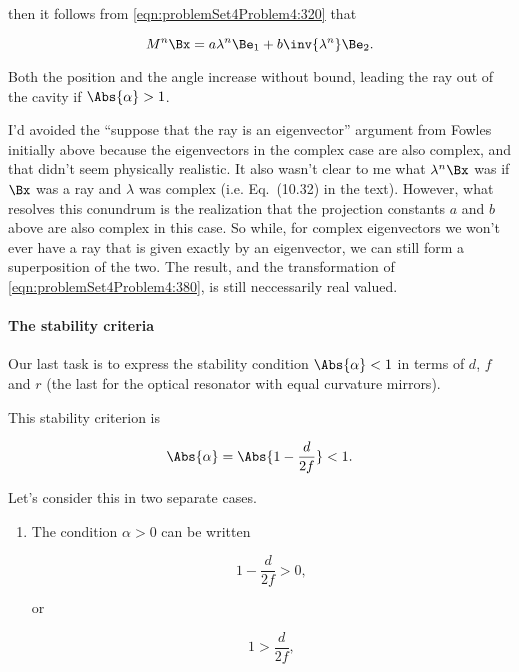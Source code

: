 {then it follows from \ref{eqn:problemSet4Problem4:320} that

\begin{dmath}\label{eqn:problemSet4Problem4:380}
M^n \Bx = a \lambda^n \Be_1 + b \inv{\lambda^n} \Be_2.
\end{dmath}

Both the position and the angle increase without bound, leading the ray out of the cavity if $\Abs{\alpha} > 1$.  

I'd avoided the ``suppose that the ray is an eigenvector'' argument from Fowles initially above because the eigenvectors in the complex case are also complex, and that didn't seem physically realistic.  It also wasn't clear to me what $\lambda^n \Bx$ was if $\Bx$ was a ray and $\lambda$ was complex (i.e.  Eq.~(10.32) in the text).  However, what resolves this conundrum is the realization that the projection constants $a$ and $b$ above are also complex in this case.  So while, for complex eigenvectors we won't ever have a ray that is given exactly by an eigenvector, we can still form a superposition of the two.  The result, and the transformation of \ref{eqn:problemSet4Problem4:380}, is still neccessarily real valued.

\paragraph{The stability criteria}

Our last task is to express the stability condition $\Abs{\alpha} < 1$ in terms of $d$, $f$ and $r$ (the last for the optical resonator with equal curvature mirrors).

This stability criterion is 

\begin{equation}\label{eqn:problemSet4Problem4:400}
\Abs{\alpha} = \Abs{1 - \frac{d}{2f}} < 1.
\end{equation}

Let's consider this in two separate cases.
\begin{enumerate}
\item The condition $\alpha > 0$ can be written

\begin{dmath}\label{eqn:problemSet4Problem4:420}
1 - \frac{d}{2f} > 0 ,
\end{dmath}

or

\begin{dmath}\label{eqn:problemSet4Problem4:560}
1 > \frac{d}{2f},
\end{dmath}


\end{enumerate}}
